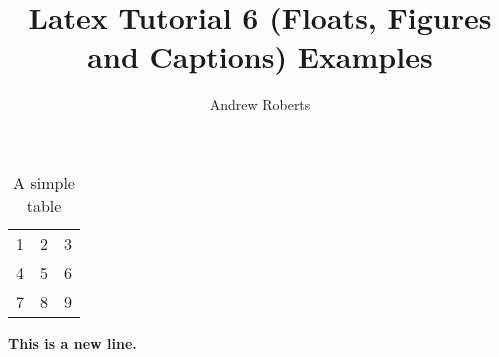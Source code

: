 \documentclass[english]{article}
\begin{document}
\title{Latex Tutorial 6 (Floats, Figures and Captions) Examples}
\author{Andrew Roberts}
\maketitle

\begin{table}[htp]
  \begin{center}
    \begin{tabular}{| l c r |}
    \hline
    1 & 2 & 3 \\
    4 & 5 & 6 \\
    7 & 8 & 9 \\
    \hline
    \end{tabular}
  \end{center}
  \caption{A simple table}
\end{table}

\textbf{This is a new line.}
\end{document}
